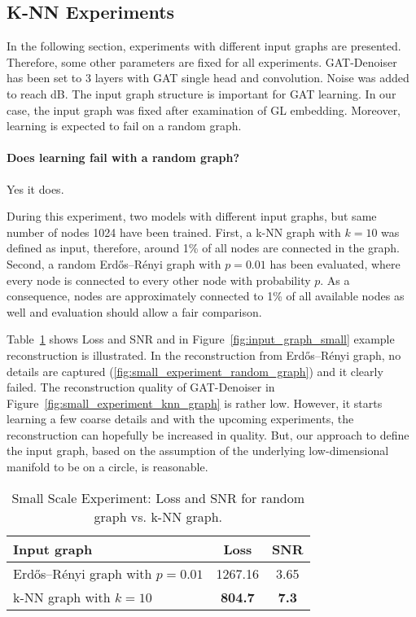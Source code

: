  \subsection{K-NN Experiments}
  In the following section, experiments with different input graphs are presented.
  Therefore, some other parameters are fixed for all experiments.
  GAT-Denoiser has been set to 3 layers with GAT single head and convolution. 
  Noise was added to reach  dB.
  The input graph structure is important for GAT learning.
  In our case, the input graph was fixed after examination of GL embedding.
  Moreover, learning is expected to fail on a random graph.

  \clearpage

  \paragraph{Does learning fail with a random graph?}
  Yes it does.

  During this experiment, two models with different input graphs, but same number of nodes 1024 have been trained.
  First, a k-NN graph with $k=10$ was defined as input, therefore, around 1\% of all nodes are connected in the graph.
  Second, a random Erdős–Rényi graph with $p=0.01$ has been evaluated, where every node is 
  connected to every other node with probability $p$. 
  As a consequence, nodes are approximately connected to 1\% of all available nodes as well and 
  evaluation should allow a fair comparison.
  
  Table~\ref{tab:input_graph} shows Loss and SNR and in Figure~\ref{fig:input_graph_small} example reconstruction is illustrated.
  In the reconstruction from Erdős–Rényi graph, no details are captured (\ref{fig:small_experiment_random_graph}) and it clearly failed. 
  The reconstruction quality of GAT-Denoiser in Figure~\ref{fig:small_experiment_knn_graph} is rather low. 
  However, it starts learning a few coarse details and with the upcoming experiments, the reconstruction can hopefully be 
  increased in quality. But, our approach to define the input graph, based on the assumption of 
  the underlying low-dimensional manifold to be on a circle, is reasonable.

  \begin{table}[H]
    \centering
      \begin{tabular}{l|cc}
      \toprule
      \small  \textbf{Input graph} & \small \textbf{Loss} & \small \textbf{SNR}  \\ 
      \midrule
      Erdős–Rényi graph with $p=0.01$    &  1267.16         &  3.65   \\ \hline
      k-NN graph with $k=10$             &  \textbf{804.7}           &  \textbf{7.3 }   \\ \hline
      \midrule
      \end{tabular}
    \caption{Small Scale Experiment: Loss and SNR for random graph vs. k-NN graph. }
    \label{tab:input_graph}
  \end{table}

